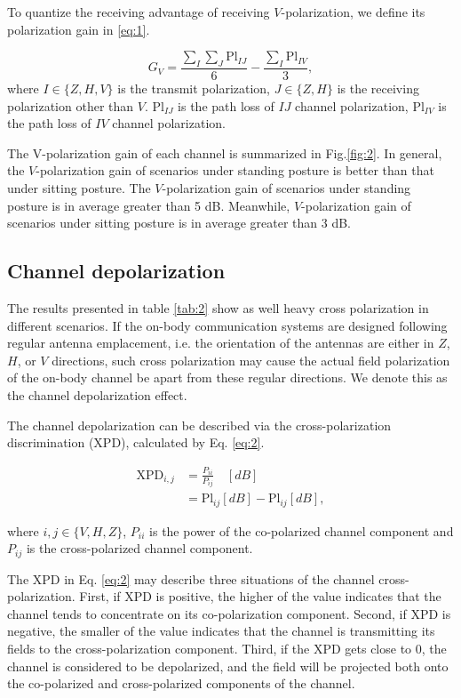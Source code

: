 \documentclass[conference]{IEEEtran}
\begin{document}
To quantize the receiving advantage of receiving $V$-polarization, we define its polarization gain in \ref{eq:1}.

\begin{equation}
	G_{V}=\frac{\sum\limits_I\sum\limits_J\text{Pl}_{IJ}}{6} -\frac{\sum\limits_I{\text{Pl}_{IV}}}{3},
\label{ep:1}
\end{equation}
where $I\in\{Z,H,V\}$ is the transmit polarization, $J\in\{Z,H\}$ is the receiving polarization other than $V$. $\text{Pl}_{IJ}$ is the path loss of $IJ$ channel polarization, $\text{Pl}_{IV}$ is the path loss of $IV$ channel polarization.

The  V-polarization gain of each channel is summarized in Fig.\ref{fig:2}. In general, the $V$-polarization gain of scenarios under standing posture is better than that under sitting posture. The $V$-polarization gain of scenarios under standing posture is in average greater than 5 dB. Meanwhile, $V$-polarization gain of scenarios under sitting posture is in average greater than 3 dB.

\subsection{Channel depolarization}
The results presented in table \ref{tab:2} show as well heavy cross polarization in different scenarios. If the on-body communication systems are designed following regular antenna emplacement, i.e. the orientation of the antennas are either in $Z$, $H$, or $V$ directions, such cross polarization may cause the actual field polarization of the on-body channel be apart from these regular directions. We denote this as the channel depolarization effect.

The channel depolarization can be described via the cross-polarization discrimination (XPD), calculated by Eq. \ref{eq:2}.

 \begin{align}
	 \text{XPD}_{i,j}&=\frac{P_{ii}}{P_{ij}} \quad[dB]\nonumber\\
	 &=\text{Pl}_{ij}[dB]-\text{Pl}_{ij}[dB], \label{eq:2}
\end{align}

where $i,j \in \{V,H,Z\}$, $P_{ii}$ is the power of the co-polarized channel component and $P_{ij}$ is the cross-polarized channel component.

The XPD in Eq. \ref{eq:2} may describe three situations of the channel cross-polarization. First, if XPD is positive, the higher of the value indicates that the channel tends to concentrate on its co-polarization component. Second, if XPD is negative, the smaller of the value indicates that the channel is transmitting its fields to the cross-polarization component. Third, if the XPD gets close to 0, the channel is considered to be depolarized, and the field will be projected both onto the co-polarized and cross-polarized components of the channel.
\end{document}
